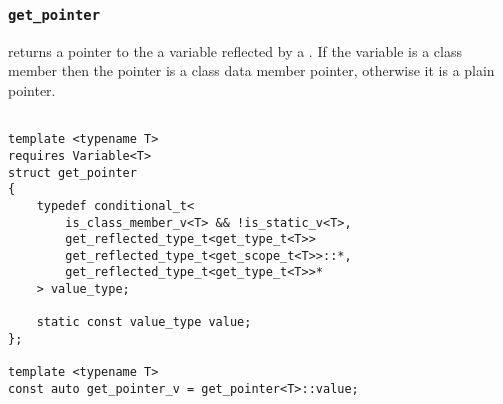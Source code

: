 
\subsubsection{\texttt{get\_pointer}}

returns a pointer to the a variable reflected by a .   If the variable is a class member then the pointer is a class data member pointer,   otherwise it is a plain pointer.

\begin{verbatim}

template <typename T>
requires Variable<T>
struct get_pointer
{
	typedef conditional_t<
		is_class_member_v<T> && !is_static_v<T>,
		get_reflected_type_t<get_type_t<T>>
		get_reflected_type_t<get_scope_t<T>>::*,
		get_reflected_type_t<get_type_t<T>>*
	> value_type;

	static const value_type value;
};
	
template <typename T>
const auto get_pointer_v = get_pointer<T>::value;

\end{verbatim}
